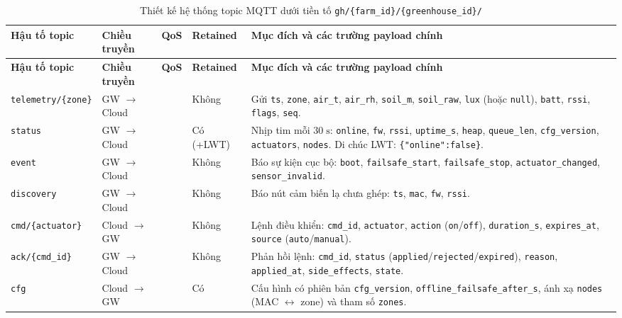 \begingroup
\footnotesize
\setlength{\tabcolsep}{3pt}
\renewcommand{\arraystretch}{1.12}
\begin{longtable}{|>{\raggedright\arraybackslash}p{}|>{\centering\arraybackslash}p{}|>{\centering\arraybackslash}p{}|>{\centering\arraybackslash}p{}|>{\raggedright\arraybackslash}p{}|}
\caption{Thiết kế hệ thống topic MQTT dưới tiền tố \texttt{gh/\{farm\_id\}/\{greenhouse\_id\}/}}\label{tab:mqtt-topics}\\
\hline
\textbf{Hậu tố topic} & \textbf{Chiều truyền} & \textbf{QoS} & \textbf{Retained} & \textbf{Mục đích và các trường payload chính} \\
\hline
\endfirsthead
\hline
\textbf{Hậu tố topic} & \textbf{Chiều truyền} & \textbf{QoS} & \textbf{Retained} & \textbf{Mục đích và các trường payload chính} \\
\hline
\endhead
\texttt{telemetry/\{zone\}} & GW \(\rightarrow\) Cloud & 1 & Không & Gửi \texttt{ts}, \texttt{zone}, \texttt{air\_t}, \texttt{air\_rh}, \texttt{soil\_m}, \texttt{soil\_raw}, \texttt{lux} (hoặc \texttt{null}), \texttt{batt}, \texttt{rssi}, \texttt{flags}, \texttt{seq}. \\
\hline
\texttt{status} & GW \(\rightarrow\) Cloud & 1 & Có (+LWT) & Nhịp tim mỗi \(30\;\text{s}\): \texttt{online}, \texttt{fw}, \texttt{rssi}, \texttt{uptime\_s}, \texttt{heap}, \texttt{queue\_len}, \texttt{cfg\_version}, \texttt{actuators}, \texttt{nodes}. Di chúc LWT: \texttt{\{"online":false\}}. \\
\hline
\texttt{event} & GW \(\rightarrow\) Cloud & 1 & Không & Báo sự kiện cục bộ: \texttt{boot}, \texttt{failsafe\_start}, \texttt{failsafe\_stop}, \texttt{actuator\_changed}, \texttt{sensor\_invalid}. \\
\hline
\texttt{discovery} & GW \(\rightarrow\) Cloud & 1 & Không & Báo nút cảm biến lạ chưa ghép: \texttt{ts}, \texttt{mac}, \texttt{fw}, \texttt{rssi}. \\
\hline
\texttt{cmd/\{actuator\}} & Cloud \(\rightarrow\) GW & 1 & Không & Lệnh điều khiển: \texttt{cmd\_id}, \texttt{actuator}, \texttt{action} (\texttt{on}/\texttt{off}), \texttt{duration\_s}, \texttt{expires\_at}, \texttt{source} (\texttt{auto}/\texttt{manual}). \\
\hline
\texttt{ack/\{cmd\_id\}} & GW \(\rightarrow\) Cloud & 1 & Không & Phản hồi lệnh: \texttt{cmd\_id}, \texttt{status} (\texttt{applied}/\texttt{rejected}/\texttt{expired}), \texttt{reason}, \texttt{applied\_at}, \texttt{side\_effects}, \texttt{state}. \\
\hline
\texttt{cfg} & Cloud \(\rightarrow\) GW & 1 & Có & Cấu hình có phiên bản \texttt{cfg\_version}, \texttt{offline\_failsafe\_after\_s}, ánh xạ \texttt{nodes} (MAC \(\leftrightarrow\) zone) và tham số \texttt{zones}. \\
\hline
\end{longtable}
\endgroup

